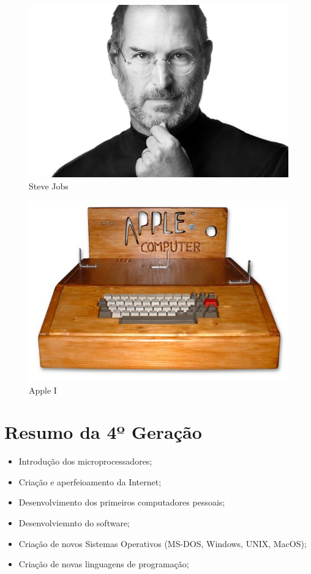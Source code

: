 \documentclass{report}
\begin{document}
\begin{figure}[h]
	\centering
	\includegraphics[scale=0.15]{fig5.png}
	\caption{Steve Jobs}
	\label{Steve}

\end{figure}

\begin{figure}[h]

	\centering

	\includegraphics[scale=0.15]{fig4.png}
	\caption{Apple I}
	\label{Apple}

\end{figure}

\section{Resumo da 4º Geração}

\begin{itemize}
	\item Introdução dos microprocessadores;
	\item Criação e aperfeioamento da Internet;
	\item Desenvolvimento dos primeiros computadores pessoais;
	\item Desenvolviemnto do software;
	\item Criação de novos Sistemas Operativos (MS-DOS, Windows, UNIX, MacOS);
	\item Criação de novas linguagens de programação;
\end{itemize}	
\end{document}
